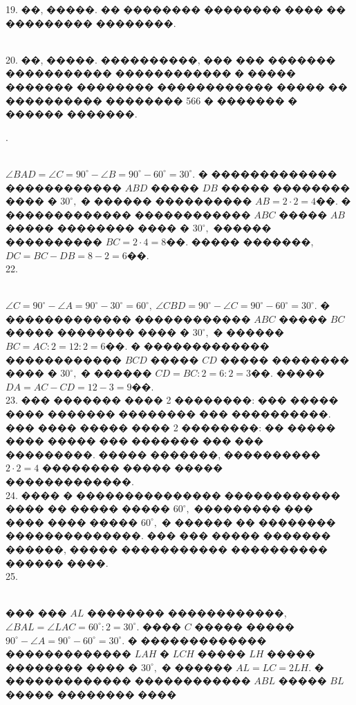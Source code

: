 \documentclass[12pt]{article}
\begin{document}
19. ��, �����. �� �������� �������� ���� �� ��������� ��������.
\begin{figure}[ht!]
\end{figure}\\
20. ��, �����. ����������, ��� ��� ������� ����������� ������������ � ����� ������� �������� ������������ ����� �� ���������� �������� 566 � ������� � ������ �������.
\begin{figure}[ht!]
\end{figure}\newpage{}. \begin{figure}[ht!]
\end{figure}\\
$\angle BAD=\angle C=90^\circ-\angle B=90^\circ-60^\circ=30^\circ.$ � ������������� ������������ $ABD$ ����� $DB$ ����� �������� ���� � $30^\circ,$ � ������ ���������� $AB=2\cdot2=4$��. � ������������� ������������ $ABC$ ����� $AB$ ����� �������� ���� � $30^\circ,$ ������ ���������� $BC=2\cdot4=8$��. ����� �������, $DC=BC-DB=8-2=6$��.\\
22. \begin{figure}[ht!]
\end{figure}\\
$\angle C=90^\circ-\angle A=90^\circ-30^\circ=60^\circ,\ \angle CBD=90^\circ-\angle C=90^\circ-60^\circ=30^\circ.$ � ������������� ������������ $ABC$ ����� $BC$ ����� �������� ���� � $30^\circ,$ � ������ $BC=AC:2=12:2=6$��. � ������������� ������������ $BCD$ ����� $CD$ ����� �������� ���� � $30^\circ,$ � ������ $CD=BC:2=6:2=3$��. ����� $DA=AC-CD=12-3=9$��.\\
23. ��� ������� ���� 2 ��������: ��� ����� ���� ������� �������� ��� ����������. ��� ���� ����� ���� 2 ��������: �� ����� ���� ����� ��� ������� ��� ��� ���������. ����� �������, ���������� $2\cdot2=4$ �������� ����� ����� �������������.\\
24. ���� � ��������������� ������������ ���� �� ����� ����� $60^\circ,$ ��������� ��� ���� ���� ����� $60^\circ,$ � ������ �� �������� ��������������. ��� ��� ����� ������� ������, ����� ����������� ���������� ������ ����.\\
25. \begin{figure}[ht!]
\end{figure}\\
��� ��� $AL$ �������� ������������, $\angle BAL=\angle LAC=60^\circ:2=30^\circ.$ ���� $C$ ����� ����� $90^\circ-\angle A=90^\circ-60^\circ=30^\circ.$ � ������������� ������������� $LAH$ � $LCH$ ����� $LH$ ����� �������� ���� � $30^\circ,$ � ������ $AL=LC=2LH.$ � ������������� ������������ $ABL$ ����� $BL$ ����� �������� ����
\end{document}
